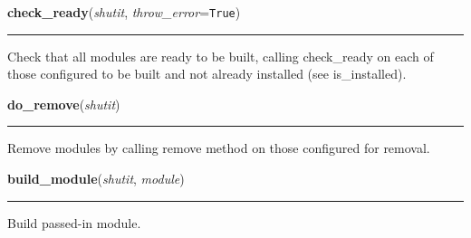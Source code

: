     \label{shutit_main:check_ready}

    \vspace{0.5ex}

\hspace{.8\funcindent}\begin{boxedminipage}{\funcwidth}

    \raggedright \textbf{check\_ready}(\textit{shutit}, \textit{throw\_error}={\tt True})

    \vspace{-1.5ex}

    \rule{\textwidth}{0.5\fboxrule}
\setlength{\parskip}{2ex}
    Check that all modules are ready to be built, calling check\_ready on 
    each of those configured to be built and not already installed (see 
    is\_installed).

\setlength{\parskip}{1ex}
    \end{boxedminipage}

    \label{shutit_main:do_remove}

    \vspace{0.5ex}

\hspace{.8\funcindent}\begin{boxedminipage}{\funcwidth}

    \raggedright \textbf{do\_remove}(\textit{shutit})

    \vspace{-1.5ex}

    \rule{\textwidth}{0.5\fboxrule}
\setlength{\parskip}{2ex}
    Remove modules by calling remove method on those configured for 
    removal.

\setlength{\parskip}{1ex}
    \end{boxedminipage}

    \label{shutit_main:build_module}

    \vspace{0.5ex}

\hspace{.8\funcindent}\begin{boxedminipage}{\funcwidth}

    \raggedright \textbf{build\_module}(\textit{shutit}, \textit{module})

    \vspace{-1.5ex}

    \rule{\textwidth}{0.5\fboxrule}
\setlength{\parskip}{2ex}
    Build passed-in module.

\setlength{\parskip}{1ex}
    \end{boxedminipage}

